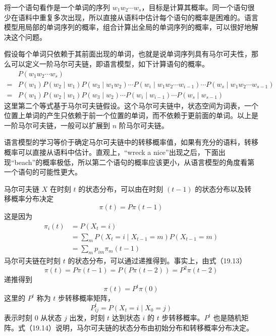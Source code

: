 \documentclass[UTF8, 12pt, fontset=fandol, oneside]{ctexart}
\begin{document}
将一个语句看作是一个单词的序列 $w_1w_2\cdots w_s$，目标是计算其概率。同一个语句很少在语料中重复多次出现，所以直接从语料中估计每个语句的概率是困难的。语言模型用局部的单词序列的概率，组合计算出全局的单词序列的概率，可以很好地解决这个问题。

假设每个单词只依赖于其前面出现的单词，也就是说单词序列具有马尔可夫性，那么可以定义一阶马尔可夫链，即语言模型，如下计算语句的概率。
\[
\begin{aligned}
&P(w_1w_2\cdots w_s)\\
={}&P(w_1)P(w_2\mid w_1)P(w_3\mid w_1w_2)\cdots P(w_i\mid w_1w_2\cdots w_{i-1})\cdots P(w_s\mid w_1w_2\cdots w_{s-1})\\
={}&P(w_1)P(w_2\mid w_1)P(w_3\mid w_2)\cdots P(w_i\mid w_{i-1})\cdots P(w_s\mid w_{s-1})
\end{aligned}
\]
这里第二个等式基于马尔可夫链假设。这个马尔可夫链中，状态空间为词表，一个位置上单词的产生只依赖于前一个位置的单词，而不依赖于更前面的单词。以上是一阶马尔可夫链，一般可以扩展到 $n$ 阶马尔可夫链。

语言模型的学习等价于确定马尔可夫链中的转移概率值，如果有充分的语料，转移概率可以直接从语料中估计。直观上，“wreck a nice”出现之后，下面出现“beach”的概率极低，所以第二个语句的概率应该更小，从语言模型的角度看第一个语句的可能性更大。

马尔可夫链 $X$ 在时刻 $t$ 的状态分布，可以由在时刻 $(t-1)$ 的状态分布以及转移概率分布决定
\begin{equation}
\pi(t)=P\pi(t-1)
\tag{19.13}
\end{equation}
这是因为
\[
\begin{aligned}
\pi_i(t)&=P(X_t=i)\\
&=\sum_m P(X_t=i\mid X_{t-1}=m)P(X_{t-1}=m)\\
&=\sum_m p_{im}\pi_m(t-1)
\end{aligned}
\]
马尔可夫链在时刻 $t$ 的状态分布，可以通过递推得到。事实上，由式（19.13）
\[
\pi(t)=P\pi(t-1)=P(P\pi(t-2))=P^2\pi(t-2)
\]
递推得到
\begin{equation}
\pi(t)=P^t\pi(0)
\tag{19.14}
\end{equation}
这里的 $P^t$ 称为 $t$ 步转移概率矩阵，
\[
P_{ij}^t=P(X_t=i\mid X_0=j)
\]
表示时刻 0 从状态 $j$ 出发，时刻 $t$ 达到状态 $i$ 的 $t$ 步转移概率。$P^t$ 也是随机矩阵。式（19.14）说明，马尔可夫链的状态分布由初始分布和转移概率分布决定。
\end{document}

